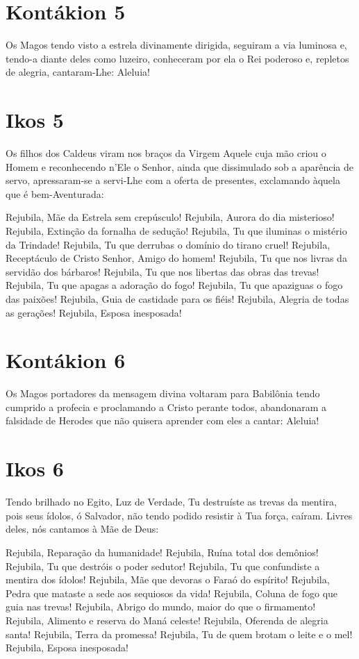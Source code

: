 \documentclass{subfiles}
\begin{document}
\section*{Kontákion 5}

Os Magos tendo visto a estrela divinamente dirigida, seguiram a via
luminosa e, tendo-a diante deles como luzeiro, conheceram por ela o Rei
poderoso e, repletos de alegria, cantaram-Lhe: Aleluia!

\section*{Ikos 5}

Os filhos dos Caldeus viram nos braços da Virgem Aquele cuja mão
criou o Homem e reconhecendo n'Ele o Senhor, ainda que dissimulado sob a
aparência de servo, apressaram-se a servi-Lhe com a oferta de presentes,
exclamando àquela que é bem-Aventurada:

Rejubila, Mãe da Estrela sem crepúsculo!
Rejubila, Aurora do dia misterioso!
Rejubila, Extinção da fornalha de sedução!
Rejubila, Tu que iluminas o mistério da Trindade!
Rejubila, Tu que derrubas o domínio do tirano cruel!
Rejubila, Receptáculo de Cristo Senhor, Amigo do homem!
Rejubila, Tu que nos livras da servidão dos bárbaros!
Rejubila, Tu que nos libertas das obras das trevas!
Rejubila, Tu que apagas a adoração do fogo!
Rejubila, Tu que apaziguas o fogo das paixões!
Rejubila, Guia de castidade para os fiéis!
Rejubila, Alegria de todas as gerações!
Rejubila, Esposa inesposada!

\section*{Kontákion 6}

Os Magos portadores da mensagem divina voltaram para Babilônia
tendo cumprido a profecia e proclamando a Cristo perante todos,
abandonaram a falsidade de Herodes que não quisera aprender com eles a
cantar: Aleluia!

\section*{Ikos 6}

Tendo brilhado no Egito, Luz de Verdade, Tu destruíste as trevas da
mentira, pois seus ídolos, ó Salvador, não tendo podido resistir à Tua força,
caíram. Livres deles, nós cantamos à Mãe de Deus:

Rejubila, Reparação da humanidade!
Rejubila, Ruína total dos demônios!
Rejubila, Tu que destróis o poder sedutor!
Rejubila, Tu que confundiste a mentira dos ídolos!
Rejubila, Mãe que devoras o Faraó do espírito!
Rejubila, Pedra que mataste a sede aos sequiosos da vida!
Rejubila, Coluna de fogo que guia nas trevas!
Rejubila, Abrigo do mundo, maior do que o firmamento!
Rejubila, Alimento e reserva do Maná celeste!
Rejubila, Oferenda de alegria santa!
Rejubila, Terra da promessa!
Rejubila, Tu de quem brotam o leite e o mel!
Rejubila, Esposa inesposada!
\end{document}
